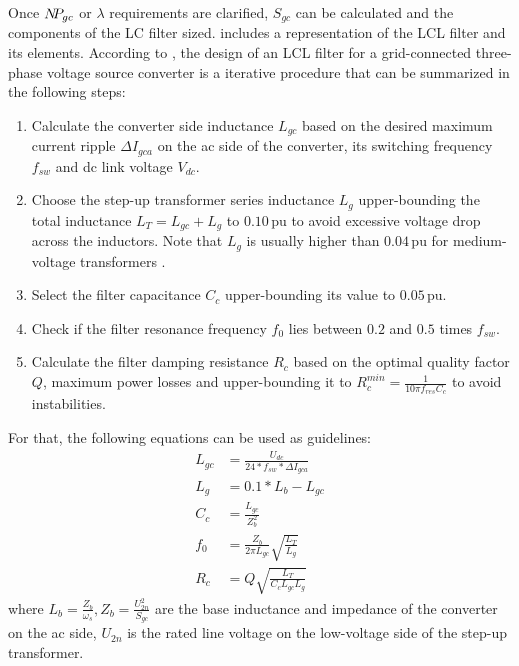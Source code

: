 \documentclass[utf8]{frontiersSCNS} %
\begin{document}
Once $N \mkern-5mu P_{gc}$ or $ \lambda$ requirements are clarified, $S_{gc}$ can be calculated and the components of the LC filter sized.  includes a representation of the LCL filter and its elements. According to \cite{ericksonFundamentalsPowerElectronics2001,liserreStepbystepDesignProcedure2004,beresReviewPassivePower2016,pena-alzolaAnalysisPassiveDamping2013}, the design of an LCL filter for a grid-connected three-phase voltage source converter is a iterative procedure that can be summarized in the following steps:

\begin{enumerate}%
    \item Calculate the converter side inductance $ L_{gc} $ based on the desired maximum current ripple $ \Delta I_{gca}$ on the ac side of the converter, its switching frequency $f_{sw}$ and dc link voltage $V_{dc}$.
    
    \item Choose the step-up transformer series inductance $ L_{g} $ upper-bounding the total inductance $ L_{T} = L_{gc} + L_{g} $ to $0.10$\,pu to avoid excessive voltage drop across the inductors. Note that $L_{g}$ is usually higher than $0.04$\,pu for medium-voltage transformers \citep{abbTechnicalDataVacuum2016,siemensGEAFOLNeoOptimum2017}.
    
    \item Select the filter capacitance $C_{c}$ upper-bounding its value to $0.05$\,pu.
    
    \item Check if the filter resonance frequency $f_{0}$ lies between $0.2$ and $0.5$ times $f_{sw}$.
    
    \item Calculate the filter damping resistance $R_{c}$ based on the optimal quality factor $Q$, maximum power losses and upper-bounding it to $R_{c}^{min}=\frac{1}{10 \pi f_{res} C_{c}} $ to avoid instabilities. 
\end{enumerate}

For that, the following equations can be used as guidelines:
\begin{align}
    L_{gc} &= \frac{U_{dc}}{24 * f_{sw} * \Delta I_{gca} } \label{eq:lc-filt-lgc}\\
    L_{g} &= 0.1*L_{b} - L_{gc} \label{eq:lc-filt-lg} \\
    C_{c} &= \frac{L_{gc}}{Z_b^2} \label{eq:lc-filt-cc} \\
    f_{0} &= \frac{Z_b}{2 \pi L_{gc}} \sqrt{\frac{L_{T}}{L_{g}}} \label{eq:lc-filt-fres} \\
    R_{c} &= Q\sqrt{\frac{L_T}{ C_{c} L_{gc} L_{g}}} \label{eq:lc-filt-rc}
\end{align}
where $L_b = \frac{Z_b}{\omega_s}, Z_b = \frac{U_{2n}^2}{S_{gc}} $ are the base inductance and impedance of the converter on the ac side, $U_{2n}$ is the rated line voltage on the low-voltage side of the step-up transformer.
\end{document}
